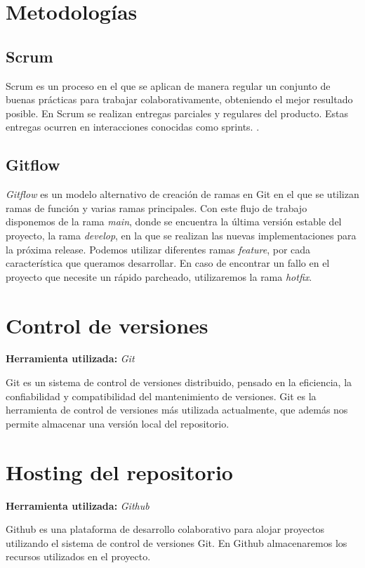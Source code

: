 
\section{Metodologías}

\subsection{Scrum}
Scrum es un proceso en el que se aplican de manera regular un conjunto de buenas prácticas para trabajar colaborativamente, obteniendo el mejor resultado posible. En Scrum se realizan entregas parciales y regulares del producto. Estas entregas ocurren en interacciones conocidas como sprints. \cite{pa:scrum}.

\subsection{Gitflow}
\emph{Gitflow} es un modelo alternativo de creación de ramas en Git en el que se utilizan ramas de función y varias ramas principales. Con este flujo de trabajo disponemos de la rama \emph{main}, donde se encuentra la última versión estable del proyecto, la rama \emph{develop}, en la que se realizan las nuevas implementaciones para la próxima release. Podemos utilizar diferentes ramas \emph{feature}, por cada característica que queramos desarrollar. En caso de encontrar un fallo en el proyecto que necesite un rápido parcheado, utilizaremos la rama \emph{hotfix}\cite{atla:gitflow}.

\section{Control de versiones}
\textbf{Herramienta utilizada: } \emph{Git}

Git es un sistema de control de versiones distribuido, pensado en la eficiencia, la confiabilidad y compatibilidad del mantenimiento de versiones\cite{wiki:git}. Git es la herramienta de control de versiones más utilizada actualmente, que además nos permite almacenar una versión local del repositorio.

\section{Hosting del repositorio}
\textbf{Herramienta utilizada: }\emph{Github}

Github es una plataforma de desarrollo colaborativo para alojar proyectos utilizando el sistema de control de versiones Git\cite{wiki:github}. En Github almacenaremos los recursos utilizados en el proyecto.

